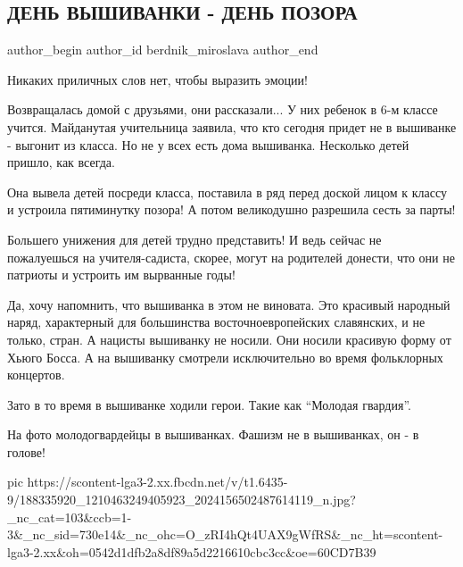 
 
 
 
 
 
\subsection{ДЕНЬ ВЫШИВАНКИ - ДЕНЬ ПОЗОРА}
\label{sec:20_05_2021.fb.berdnik_miroslava.1.den_vyshyvanki_pozor}
\ifcmt
 author_begin
   author_id berdnik_miroslava
 author_end
\fi

Никаких приличных слов нет, чтобы выразить эмоции!

Возвращалась домой с друзьями, они рассказали... У них ребенок в 6-м классе
учится. Майданутая учительница заявила, что кто сегодня придет не в вышиванке -
выгонит из класса. Но не у всех есть дома вышиванка. Несколько детей пришло,
как всегда.

Она вывела детей посреди класса, поставила в ряд перед доской лицом к классу и
устроила пятиминутку позора! А потом великодушно разрешила сесть за парты!

Большего унижения для детей трудно представить!  И ведь сейчас не пожалуешься
на учителя-садиста, скорее, могут на родителей донести, что они не патриоты и
устроить им вырванные годы!

Да, хочу напомнить, что вышиванка в этом не виновата. Это красивый народный
наряд, характерный для большинства восточноевропейских славянских, и не только,
стран. А нацисты вышиванку не носили. Они носили красивую форму от Хьюго Босса.
А на вышиванку смотрели исключительно во время фольклорных концертов.

Зато в то время в вышиванке ходили герои. Такие как \enquote{Молодая гвардия}.

На фото молодогвардейцы в вышиванках. Фашизм не в вышиванках, он - в голове!

\ifcmt
  pic https://scontent-lga3-2.xx.fbcdn.net/v/t1.6435-9/188335920_1210463249405923_2024156502487614119_n.jpg?_nc_cat=103&ccb=1-3&_nc_sid=730e14&_nc_ohc=O_zRI4hQt4UAX9gWfRS&_nc_ht=scontent-lga3-2.xx&oh=0542d1dfb2a8df89a5d2216610cbc3cc&oe=60CD7B39

